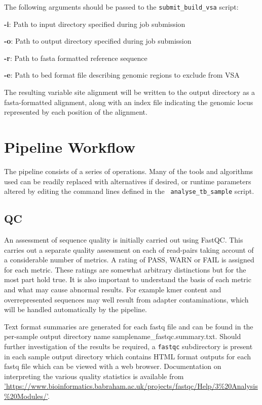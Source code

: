 \documentclass[a4paper,10pt,twoside]{article}
\newenvironment{tight_itemize}{
\begin{itemize}
  \setlength{\itemsep}{0pt}
  \setlength{\parskip}{0pt}
}{\end{itemize}}
\begin{document}
The following arguments should be passed to the {\tt submit\_build\_vsa} script:

\begin{tight_itemize}
\item \textbf{-i}: Path to input directory specified during job submission
\item \textbf{-o}: Path to output directory specified during job submission
\item \textbf{-r}: Path to fasta formatted reference sequence
\item \textbf{-e}: Path to bed format file describing genomic regions to exclude from VSA
\end{tight_itemize}

The resulting variable site alignment will be written to the output directory
as a fasta-formatted alignment, along with an index file indicating the genomic
locus represented by each position of the alignment.

\section{Pipeline Workflow}

The pipeline consists of a series of operations. Many of the tools and
algorithms used can be readily replaced with alternatives if desired, or
runtime parameters altered by editing the command lines defined in the {\tt
analyse\_tb\_sample} script. 

\subsection{QC}

An assessment of sequence quality is initially carried out using FastQC. This
carries out a separate quality assessment on each of read-pairs taking account
of a considerable number of metrics. A rating of PASS, WARN or FAIL is assigned
for each metric. These ratings are somewhat arbitrary distinctions but for the
most part hold true. It is also important to understand the basis of each
metric and what may cause abnormal results. For example kmer content and
overrepresented sequences may well result from adapter contaminations, which
will be handled automatically by the pipeline. 

Text format summaries are generated for each fastq file and can be found in the
per-sample output directory name samplename\_fastqc.summary.txt. Should further
investigation of the results be required, a {\tt fastqc} subdirectory is
present in each sample output directory which contains HTML format outputs for
each fastq file which can be viewed with a web browser. Documentation on
interpreting the various quality statistics is available from
\href{https://www.bioinformatics.babraham.ac.uk/projects/fastqc/Help/3\%20Analysis\%20Modules}{'https://www.bioinformatics.babraham.ac.uk/projects/fastqc/Help/3\%20Analysis\%20Modules/'}.
\end{document}
